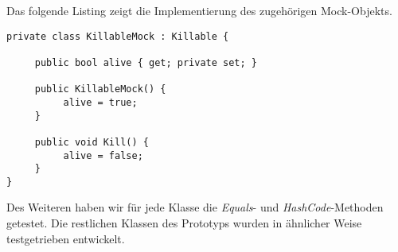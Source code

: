 Das folgende Listing zeigt die Implementierung des zugehörigen Mock-Objekts.\\

\begin{lstlisting}[caption={[\textit{Killable}-Mock für den KillKillable-Test]\textit{Killable}-Mock für den KillKillable-Test}]
private class KillableMock : Killable {

     public bool alive { get; private set; }

     public KillableMock() {
          alive = true;
     }

     public void Kill() {
          alive = false;
     }
}
\end{lstlisting}

Des Weiteren haben wir für jede Klasse die \textit{Equals}- und \textit{HashCode}-Methoden getestet. Die restlichen Klassen des Prototyps wurden in ähnlicher Weise testgetrieben entwickelt.